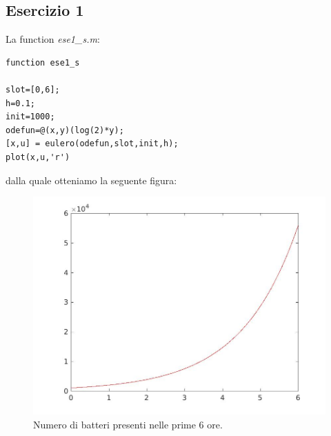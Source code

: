 \documentclass[11pt,a4paper,twoside,openright,titlepage,
headinclude,footinclude,BCOR5mm,
numbers=noenddot,cleardoublepage=empty,
tablecaptionabove]{scrbook}
\begin{document}
\subsection{Esercizio 1}
La function \emph{ese1\_s.m}:
\begin{lstlisting}[frame=trBL]
function ese1_s 

slot=[0,6];
h=0.1;
init=1000;
odefun=@(x,y)(log(2)*y);
[x,u] = eulero(odefun,slot,init,h);
plot(x,u,'r')
\end{lstlisting}
dalla quale otteniamo la seguente figura:
\begin{center}
\begin{figure}[h!]
\includegraphics[width=\textwidth]{figs/ese1_s.jpg}
\caption{Numero di batteri presenti nelle prime 6 ore.}
\end{figure}
\end{center}
\end{document}
